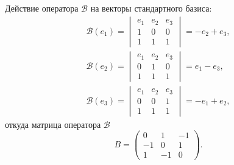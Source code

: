 \documentclass[12pt]{article}
\begin{document}
    Действие оператора $\mathcal{B}$ на векторы стандартного базиса:
    \begin{gather}
        \mathcal{B}(e_1)
        =
        \begin{vmatrix}
            e_1 & e_2 & e_3 \\
            1   & 0   & 0   \\
            1   & 1   & 1
        \end{vmatrix}
        = - e_2 + e_3 , \\
        \mathcal{B}(e_2)
        =
        \begin{vmatrix}
            e_1 & e_2 & e_3 \\
            0   & 1   & 0   \\
            1   & 1   & 1
        \end{vmatrix}
        = e_1 - e_3 , \\
        \mathcal{B}(e_3)
        =
        \begin{vmatrix}
            e_1 & e_2 & e_3 \\
            0   & 0   & 1   \\
            1   & 1   & 1
        \end{vmatrix}
        = - e_1 + e_2 ,
    \end{gather}
    откуда матрица оператора $\mathcal{B}$
    \[
        B
        =
        \begin{pmatrix}
            0  & 1  & -1 \\
            -1 & 0  & 1  \\
            1  & -1 & 0
        \end{pmatrix}
        .
    \]
\end{document}
